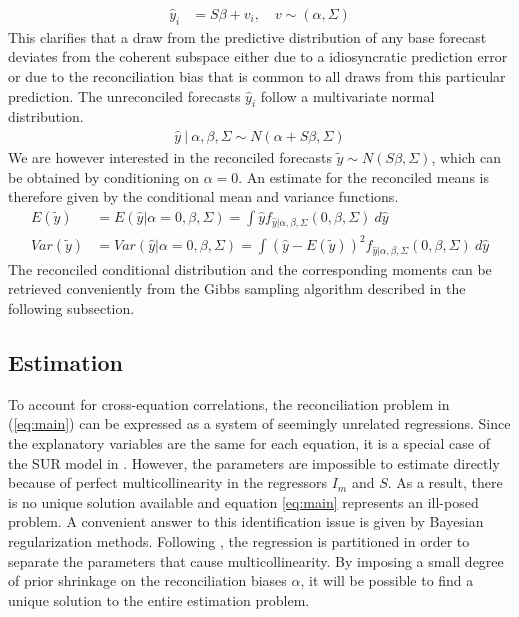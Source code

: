 \documentclass[a4paper,fleqn,11pt]{article}
\begin{document}
\begin{align}
	\hat{y}_i &=  S\beta + v_i, \quad v \sim (\alpha,\Sigma)
\end{align}
This clarifies that a draw from the predictive distribution of any base forecast deviates from the coherent subspace either due to a idiosyncratic prediction error or due to the reconciliation bias that is common to all draws from this particular prediction. The unreconciled forecasts $\hat{y}_{i}$ follow a multivariate normal distribution.
\begin{align}
\hat{y}\ |\ \alpha,\beta,\Sigma \sim N(\alpha + S\beta,\Sigma)
\end{align}
We are however interested in the reconciled forecasts $\tilde{y} \sim N(S\beta,\Sigma)$, which can be obtained by conditioning on $\alpha = 0$. An estimate for the reconciled means is therefore given by the conditional mean and variance functions.
\begin{align*}
E(\tilde{y}) &= E(\hat{y}|\alpha = 0,\beta,\Sigma) = \int \hat{y} f_{\hat{y}|\alpha,\beta,\Sigma}(0,\beta,\Sigma)\ d\hat{y} \\
Var(\tilde{y}) &= Var(\hat{y}|\alpha = 0,\beta,\Sigma) =  \int (\hat{y} - E(\tilde{y}))^2 f_{\hat{y}|\alpha,\beta,\Sigma}(0,\beta,\Sigma)\ d\hat{y}
\end{align*}
The reconciled conditional distribution and the corresponding moments can be retrieved conveniently from the Gibbs sampling algorithm described in the following subsection.\\

\subsection{Estimation}
To account for cross-equation correlations, the reconciliation problem in (\ref{eq:main}) can be expressed as a system of seemingly unrelated regressions. Since the explanatory variables are the same for each equation, it is a special case of the SUR model in \cite{Zellner1962}. However, the parameters are impossible to estimate directly because of perfect multicollinearity in the regressors $I_m$ and $S$. As a result, there is no unique solution available and equation \ref{eq:main} represents an ill-posed problem. A convenient answer to this identification issue is given by Bayesian regularization methods. Following \cite{Farebrother1978}, the regression is partitioned in order to separate the parameters that cause multicollinearity. By imposing a small degree of prior shrinkage on the reconciliation biases $\alpha$, it will be possible to find a unique solution to the entire estimation problem.\\
\end{document}
